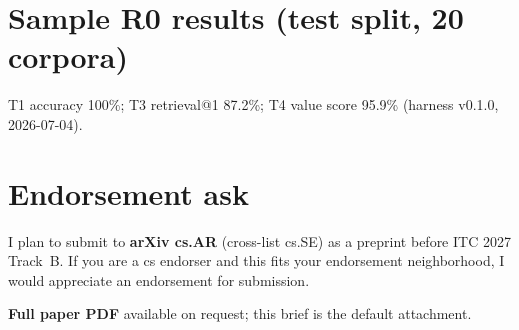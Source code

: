 \documentclass[10pt]{article}
\begin{document}
\section*{Sample R0 results (test split, 20 corpora)}
T1 accuracy 100\%; T3 retrieval@1 87.2\%; T4 value score 95.9\% (harness v0.1.0, 2026-07-04).

\section*{Endorsement ask}
I plan to submit to \textbf{arXiv cs.AR} (cross-list cs.SE) as a preprint before ITC 2027 Track~B.
If you are a cs endorser and this fits your endorsement neighborhood, I would appreciate an endorsement for submission.

\vspace{0.5em}
\noindent\textbf{Full paper PDF} available on request; this brief is the default attachment.
\end{document}
